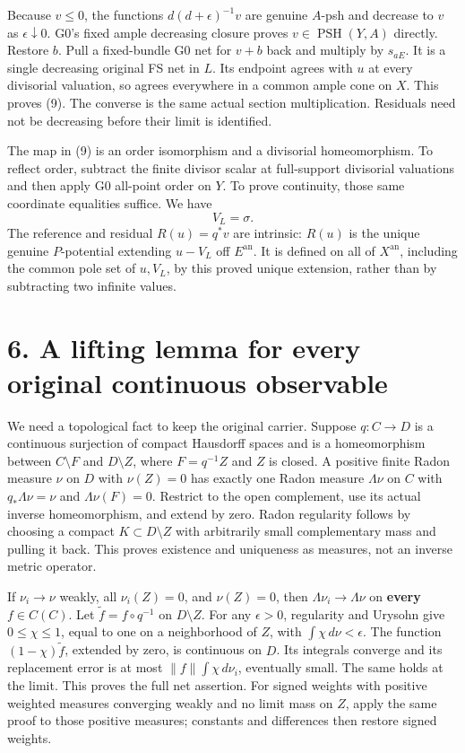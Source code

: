 \documentclass[
  10pt,
]{article}
\begin{document}
Because \(v\le0\), the functions \(d(d+\epsilon)^{-1}v\) are genuine
\(A\)-psh and decrease to \(v\) as \(\epsilon\downarrow0\). G0's fixed
ample decreasing closure proves \(v\in\operatorname{PSH}(Y,A)\)
directly. Restore \(b\). Pull a fixed-bundle G0 net for \(v+b\) back and
multiply by \(s_{aE}\). It is a single decreasing original FS net in
\(L\). Its endpoint agrees with \(u\) at every divisorial valuation, so
agrees everywhere in a common ample cone on \(X\). This proves (9). The
converse is the same actual section multiplication. Residuals need not
be decreasing before their limit is identified.

The map in (9) is an order isomorphism and a divisorial homeomorphism.
To reflect order, subtract the finite divisor scalar at full-support
divisorial valuations and then apply G0 all-point order on \(Y\). To
prove continuity, those same coordinate equalities suffice. We have
\[V_L=\sigma.\] The reference and residual \(R(u)=q^*v\) are intrinsic:
\(R(u)\) is the unique genuine \(P\)-potential extending \(u-V_L\) off
\(E^{\mathrm{an}}\). It is defined on all of \(X^{\mathrm{an}}\),
including the common pole set of \(u,V_L\), by this proved unique
extension, rather than by subtracting two infinite values.

\section{6. A lifting lemma for every original continuous
observable}\label{a-lifting-lemma-for-every-original-continuous-observable}

We need a topological fact to keep the original carrier. Suppose
\(q:C\to D\) is a continuous surjection of compact Hausdorff spaces and
is a homeomorphism between \(C\setminus F\) and \(D\setminus Z\), where
\(F=q^{-1}Z\) and \(Z\) is closed. A positive finite Radon measure
\(\nu\) on \(D\) with \(\nu(Z)=0\) has exactly one Radon measure
\(\Lambda\nu\) on \(C\) with \(q_*\Lambda\nu=\nu\) and
\(\Lambda\nu(F)=0\). Restrict to the open complement, use its actual
inverse homeomorphism, and extend by zero. Radon regularity follows by
choosing a compact \(K\subset D\setminus Z\) with arbitrarily small
complementary mass and pulling it back. This proves existence and
uniqueness as measures, not an inverse metric operator.

If \(\nu_i\to\nu\) weakly, all \(\nu_i(Z)=0\), and \(\nu(Z)=0\), then
\(\Lambda\nu_i\to\Lambda\nu\) on \textbf{every} \(f\in C(C)\). Let
\(\widetilde f=f\circ q^{-1}\) on \(D\setminus Z\). For any
\(\epsilon>0\), regularity and Urysohn give \(0\le\chi\le1\), equal to
one on a neighborhood of \(Z\), with \(\int\chi\,d\nu<\epsilon\). The
function \((1-\chi)\widetilde f\), extended by zero, is continuous on
\(D\). Its integrals converge and its replacement error is at most
\(\|f\|\int\chi\,d\nu_i\), eventually small. The same holds at the
limit. This proves the full net assertion. For signed weights with
positive weighted measures converging weakly and no limit mass on \(Z\),
apply the same proof to those positive measures; constants and
differences then restore signed weights.
\end{document}
